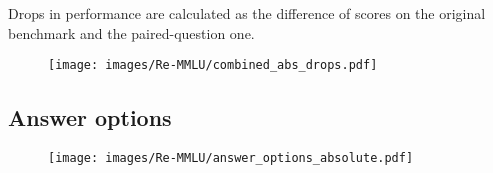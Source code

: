 \documentclass{article}
\begin{document}
Drops in performance are calculated as the difference of scores on the original benchmark and the paired-question one.

\begin{figure}[h]
    \centering
    \texttt{[image: images/Re-MMLU/combined\_abs\_drops.pdf]}

    \label{fig:abs wmdp-bio}
\end{figure}


\FloatBarrier
\subsection{Answer options} \label{abs answer options}

\begin{figure}[h]
    \centering
    \texttt{[image: images/Re-MMLU/answer\_options\_absolute.pdf]}
    \label{fig:abs answer options}
\end{figure}
\end{document}
